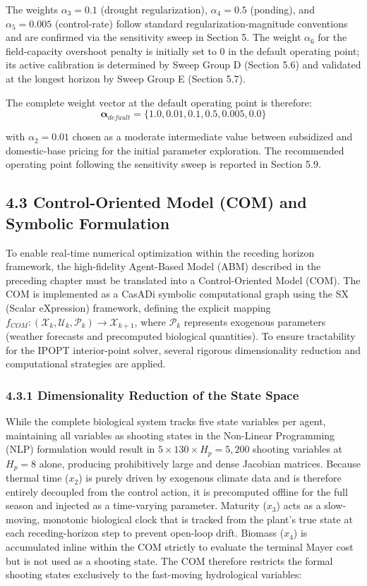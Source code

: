 The weights \(\alpha_3 = 0.1\) (drought regularization),
\(\alpha_4 = 0.5\) (ponding), and \(\alpha_5 = 0.005\) (control-rate)
follow standard regularization-magnitude conventions and are confirmed
via the sensitivity sweep in Section 5. The weight \(\alpha_6\) for the
field-capacity overshoot penalty is initially set to \(0\) in the
default operating point; its active calibration is determined by Sweep
Group D (Section 5.6) and validated at the longest horizon by Sweep
Group E (Section 5.7).

The complete weight vector at the default operating point is therefore:
\[\boldsymbol{\alpha}_{default} = \{1.0, 0.01, 0.1, 0.5, 0.005, 0.0\}\]

with \(\alpha_2 = 0.01\) chosen as a moderate intermediate value between
subsidized and domestic-base pricing for the initial parameter
exploration. The recommended operating point following the sensitivity
sweep is reported in Section 5.9.

\subsection{4.3 Control-Oriented Model (COM) and Symbolic
Formulation}\label{control-oriented-model-com-and-symbolic-formulation}

To enable real-time numerical optimization within the receding horizon
framework, the high-fidelity Agent-Based Model (ABM) described in the
preceding chapter must be translated into a Control-Oriented Model
(COM). The COM is implemented as a CasADi symbolic computational graph
using the SX (Scalar eXpression) framework, defining the explicit
mapping
\(f_{COM}: (\mathcal{X}_k, \mathcal{U}_k, \mathcal{P}_k) \to \mathcal{X}_{k+1}\),
where \(\mathcal{P}_k\) represents exogenous parameters (weather
forecasts and precomputed biological quantities). To ensure tractability
for the IPOPT interior-point solver, several rigorous dimensionality
reduction and computational strategies are applied.

\subsubsection{4.3.1 Dimensionality Reduction of the State
Space}\label{dimensionality-reduction-of-the-state-space}

While the complete biological system tracks five state variables per
agent, maintaining all variables as shooting states in the Non-Linear
Programming (NLP) formulation would result in
\(5 \times 130 \times H_p = 5{,}200\) shooting variables at \(H_p = 8\)
alone, producing prohibitively large and dense Jacobian matrices.
Because thermal time (\(x_2\)) is purely driven by exogenous climate
data and is therefore entirely decoupled from the control action, it is
precomputed offline for the full season and injected as a time-varying
parameter. Maturity (\(x_3\)) acts as a slow-moving, monotonic
biological clock that is tracked from the plant's true state at each
receding-horizon step to prevent open-loop drift. Biomass (\(x_4\)) is
accumulated inline within the COM strictly to evaluate the terminal
Mayer cost but is not used as a shooting state. The COM therefore
restricts the formal shooting states exclusively to the fast-moving
hydrological variables:

